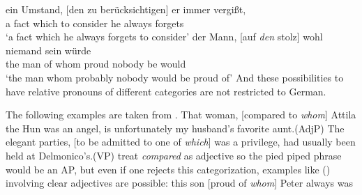 \ex
\gll ein Umstand, [den zu berücksichtigen] er immer vergißt,\footnotemark\\
     a   fact     \spacebr{}which to consider he always forgets\\
\glt `a fact which he always forgets to consider'
\ex 
\gll der Mann, [auf \emph{den} stolz] wohl niemand sein würde\\
     the man   \spacebr{}of  whom proud \partic{} nobody be would\\
\glt `the man whom probably nobody would be proud of'
\zl
And these possibilities to have relative pronouns of different categories are not restricted to
German. 

The following examples are taken from \citet[]{NS78a-u}.
\eal
\ex That woman, [compared to \emph{whom}] Attila the Hun was an angel, is unfortunately my husband's
favorite aunt.\hfill(AdjP)
\ex The elegant parties, [to be admitted to one of \emph{which}] was a privilege, had usually been held at Delmonico's.\hfill(VP)
\zl
\citet[--312]{NS78a-u} treat \emph{compared} as adjective so the pied piped phrase would be an AP, but even
if one rejects this categorization, examples like () involving clear adjectives are possible:
\ea
this son [proud of \emph{whom}] Peter always was
\z

